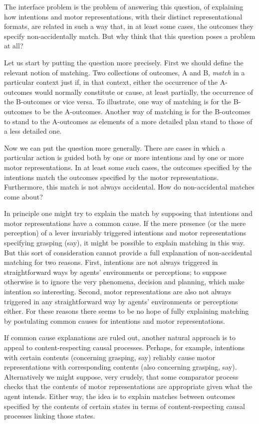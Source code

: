 \documentclass[12pt,\papersize]{extarticle}
\begin{document}
The interface problem is the problem of answering this question, of explaining how intentions and motor representations, with their distinct representational formats, are related in such a way that, in at least some cases, the outcomes they specify non-accidentally match. But why think that this question poses a problem at all?  

Let us start by putting the question more precisely.  First we should define the relevant notion of matching. Two collections of outcomes, A and B, \emph{match} in a particular context just if, in that context, either the occurrence of the A-outcomes would normally constitute or cause, at least partially, the occurrence of the B-outcomes or vice versa. To illustrate, one way of matching is for the B-outcomes to be the A-outcomes. Another way of matching is for the B-outcomes to stand to the A-outcomes as elements of a more detailed plan stand to those of a less detailed one.

Now we can put the question more generally. There are cases in which a particular action is guided both by one or more intentions and by one or more motor representations. In at least some such cases, the outcomes specified by the intentions match the outcomes specified by the motor representations. Furthermore, this match is not always accidental. How do non-accidental matches come about?  

In principle one might try to explain the match by supposing that intentions and motor representations have a common cause. If the mere presence (or the mere perception) of a lever invariably triggered intentions and motor representations specifying grasping (say), it might be possible to explain matching in this way. But this sort of consideration cannot provide a full explanation of non-accidental matching for two reasons. First, intentions are not always triggered in straightforward ways by agents' environments or perceptions; to suppose otherwise is to ignore the very phenomena, decision and planning, which make intention so interesting.  Second, motor representations are also not always triggered in any straightforward way by agents' environments or perceptions either.  For these reasons there seems to be no hope of fully explaining matching by postulating common causes for intentions and motor representations.

If common cause explanations are ruled out, another natural approach is to  appeal to content-respecting causal processes. Perhaps, for example, intentions with certain contents (concerning grasping, say) reliably cause motor representations with corresponding contents (also concerning grasping, say). Alternatively we might suppose, very crudely, that some comparator process checks that the contents of motor representations are appropriate given what the agent intends.  Either way, the idea is to explain matches between outcomes specified by the contents of certain states in terms of content-respecting causal processes linking those states. 
\end{document}
